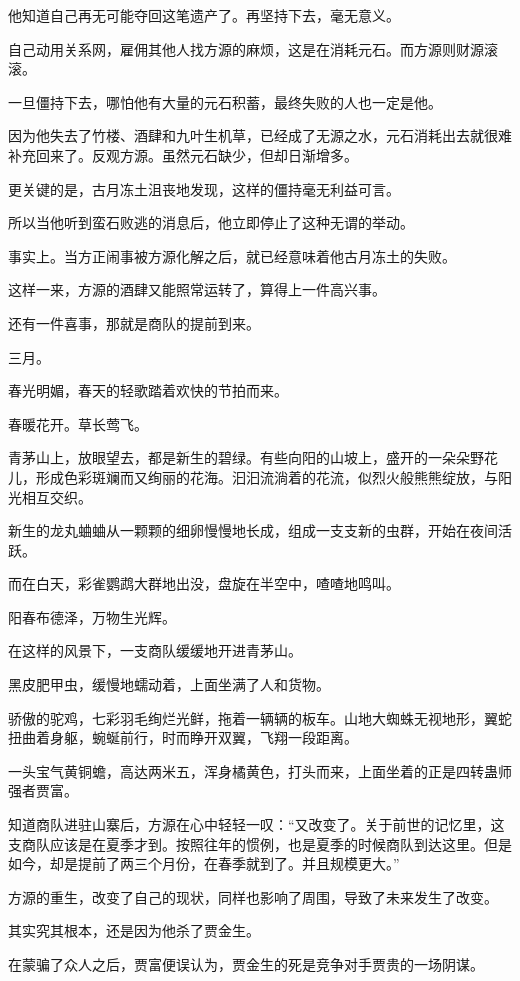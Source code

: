\begin{this_body}
他知道自己再无可能夺回这笔遗产了。再坚持下去，毫无意义。

自己动用关系网，雇佣其他人找方源的麻烦，这是在消耗元石。而方源则财源滚滚。

一旦僵持下去，哪怕他有大量的元石积蓄，最终失败的人也一定是他。

因为他失去了竹楼、酒肆和九叶生机草，已经成了无源之水，元石消耗出去就很难补充回来了。反观方源。虽然元石缺少，但却日渐增多。

更关键的是，古月冻土沮丧地发现，这样的僵持毫无利益可言。

所以当他听到蛮石败逃的消息后，他立即停止了这种无谓的举动。

事实上。当方正闹事被方源化解之后，就已经意味着他古月冻土的失败。

这样一来，方源的酒肆又能照常运转了，算得上一件高兴事。

还有一件喜事，那就是商队的提前到来。

三月。

春光明媚，春天的轻歌踏着欢快的节拍而来。

春暖花开。草长莺飞。

青茅山上，放眼望去，都是新生的碧绿。有些向阳的山坡上，盛开的一朵朵野花儿，形成色彩斑斓而又绚丽的花海。汩汩流淌着的花流，似烈火般熊熊绽放，与阳光相互交织。

新生的龙丸蛐蛐从一颗颗的细卵慢慢地长成，组成一支支新的虫群，开始在夜间活跃。

而在白天，彩雀鹦鹉大群地出没，盘旋在半空中，喳喳地鸣叫。

阳春布德泽，万物生光辉。

在这样的风景下，一支商队缓缓地开进青茅山。

黑皮肥甲虫，缓慢地蠕动着，上面坐满了人和货物。

骄傲的驼鸡，七彩羽毛绚烂光鲜，拖着一辆辆的板车。山地大蜘蛛无视地形，翼蛇扭曲着身躯，蜿蜒前行，时而睁开双翼，飞翔一段距离。

一头宝气黄铜蟾，高达两米五，浑身橘黄色，打头而来，上面坐着的正是四转蛊师强者贾富。

知道商队进驻山寨后，方源在心中轻轻一叹：“又改变了。关于前世的记忆里，这支商队应该是在夏季才到。按照往年的惯例，也是夏季的时候商队到达这里。但是如今，却是提前了两三个月份，在春季就到了。并且规模更大。”

方源的重生，改变了自己的现状，同样也影响了周围，导致了未来发生了改变。

其实究其根本，还是因为他杀了贾金生。

在蒙骗了众人之后，贾富便误认为，贾金生的死是竞争对手贾贵的一场阴谋。


\end{this_body}
